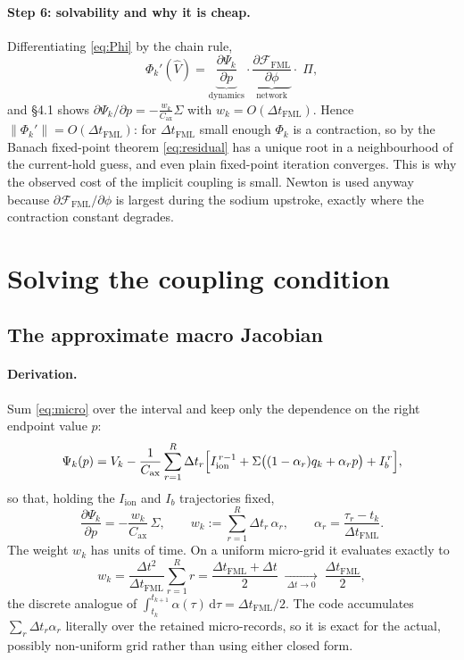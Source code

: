 \documentclass[11pt]{article}
\newcommand{\Iion}{I_{\mathrm{ion}}}
\newcommand{\Ib}{I_{b}}
\newcommand{\Cax}{C_{\mathrm{ax}}}
\newcommand{\FML}{\mathcal{F}_{\mathrm{FML}}}
\newcommand{\dd}{\mathrm{d}}
\newcommand{\dtF}{\Delta t_{\mathrm{FML}}}
\begin{document}
\paragraph{Step 6: solvability and why it is cheap.}
Differentiating \eqref{eq:Phi} by the chain rule,
\begin{equation}
\Phi_k'(\widehat V)
=\underbrace{\frac{\partial\Psi_k}{\partial p}}_{\text{dynamics}}
\cdot
\underbrace{\frac{\partial\FML}{\partial\phi}}_{\text{network}}
\cdot\;\Pi,
\label{eq:chain}
\end{equation}
and \S4.1 shows $\partial\Psi_k/\partial p=-\tfrac{w_k}{\Cax}\Sigma$ with
$w_k=O(\dtF)$. Hence $\|\Phi_k'\|=O(\dtF)$: for $\dtF$ small enough $\Phi_k$ is a
contraction, so by the Banach fixed-point theorem \eqref{eq:residual} has a
unique root in a neighbourhood of the current-hold guess, and even plain
fixed-point iteration converges. This is why the observed cost of the implicit
coupling is small. Newton is used anyway because $\partial\FML/\partial\phi$ is
largest during the sodium upstroke, exactly where the contraction constant
degrades.

\section{Solving the coupling condition}

\subsection{The approximate macro Jacobian}
\label{sec:jac}

\paragraph{Derivation.} Sum \eqref{eq:micro} over the interval and keep only the
dependence on the right endpoint value $p$:
\begin{equation}
\Psi_k(p)=V_k-\frac{1}{\Cax}\sum_{r=1}^{R}\Delta t_r
\Bigl[\Iion^{\,r-1}+\Sigma\bigl((1-\alpha_r)q_k+\alpha_r p\bigr)+\Ib^{\,r}\Bigr],
\end{equation}
so that, holding the $\Iion$ and $\Ib$ trajectories fixed,
\begin{equation}
\frac{\partial\Psi_k}{\partial p}=-\frac{w_k}{\Cax}\,\Sigma,
\qquad
w_k:=\sum_{r=1}^{R}\Delta t_r\,\alpha_r,
\qquad
\alpha_r=\frac{\tau_r-t_k}{\dtF}.
\label{eq:weight}
\end{equation}
The weight $w_k$ has units of time. On a uniform micro-grid it evaluates exactly
to
\begin{equation}
w_k=\frac{\Delta t^2}{\dtF}\sum_{r=1}^{R}r=\frac{\dtF+\Delta t}{2}
\;\xrightarrow[\ \Delta t\to0\ ]{}\;\frac{\dtF}{2},
\end{equation}
the discrete analogue of $\int_{t_k}^{t_{k+1}}\alpha(\tau)\,\dd\tau=\dtF/2$. The
code accumulates $\sum_r\Delta t_r\alpha_r$ literally over the retained
micro-records, so it is exact for the actual, possibly non-uniform grid rather
than using either closed form.
\end{document}
